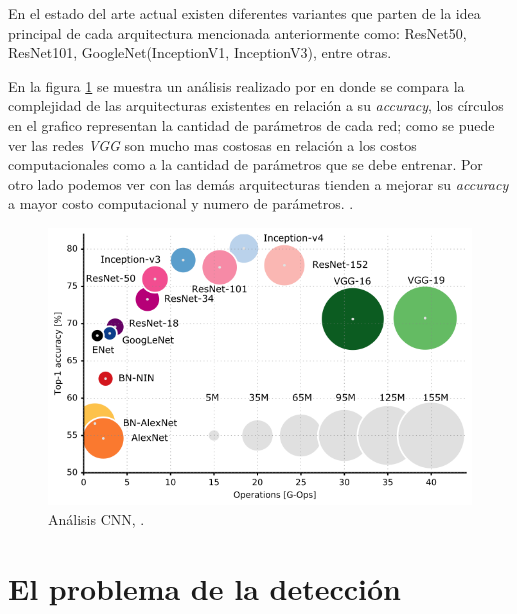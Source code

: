 En el estado del arte actual existen diferentes variantes que parten de la idea principal de cada arquitectura mencionada anteriormente como: ResNet50, ResNet101, GoogleNet(InceptionV1, InceptionV3), entre otras. 

En la  figura \ref{Fig:cnn-analisis} se muestra un análisis realizado por \cite{Analysis_deep_network} en donde se compara la complejidad de las arquitecturas existentes en relación a su \textit{accuracy}, los círculos en el grafico representan la cantidad de parámetros de cada red; como se puede ver las redes \textit{VGG} son mucho mas costosas en relación a los costos computacionales como a la cantidad de parámetros que se debe entrenar. Por otro lado podemos ver con las demás arquitecturas tienden a mejorar su \textit{accuracy} a mayor costo computacional y numero de parámetros.
.

\begin{figure}[H]
 \centering
  \includegraphics[scale=0.5,keepaspectratio=true,clip=true]{imagenes/MarcoTeorico/cnn-analisis.png}
  \caption{Análisis CNN, \citep{cazani_grap}.}\label{Fig:cnn-analisis}
\end{figure}



\section{El problema de la detección}\label{sub:problema_deteccion}


